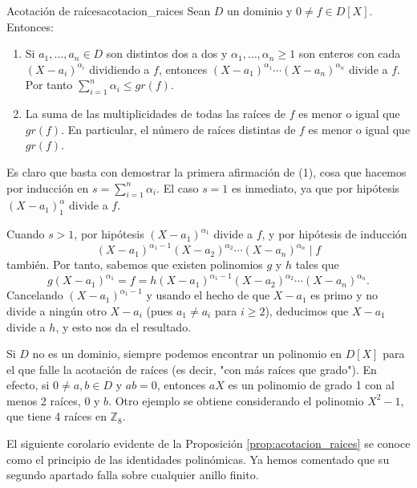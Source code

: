 \begin{proposition}{Acotación de raíces}{acotacion_raices}
Sean $D$ un dominio y $0 \neq f \in D[X]$. Entonces:

\begin{enumerate}
\item Si $a_1, \ldots, a_n \in D$ son distintos dos a dos y $\alpha_1, \ldots, \alpha_n \geq 1$ son enteros con cada $(X - a_i)^{\alpha_i}$ dividiendo a $f$, entonces $(X - a_1)^{\alpha_1} \cdots (X - a_n)^{\alpha_n}$ divide a $f$. Por tanto $\sum_{i=1}^n \alpha_i \leq gr(f)$.

\item La suma de las multiplicidades de todas las raíces de $f$ es menor o igual que $gr(f)$. En particular, el número de raíces distintas de $f$ es menor o igual que $gr(f)$.
\end{enumerate}
\end{proposition}

\begin{proofbox}
Es claro que basta con demostrar la primera afirmación de (1), cosa que hacemos por inducción en $s = \sum_{i=1}^n \alpha_i$. El caso $s = 1$ es inmediato, ya que por hipótesis $(X - a_1)^\alpha_1$ divide a $f$.

Cuando $s > 1$, por hipótesis $(X - a_1)^{\alpha_1}$ divide a $f$, y por hipótesis de inducción
\[
(X - a_1)^{\alpha_1 - 1}(X - a_2)^{\alpha_2} \cdots (X - a_{n})^{\alpha_{n}} \mid f
\]
también. Por tanto, sabemos que existen polinomios $g$ y $h$ tales que
\[
g(X - a_1)^{\alpha_1} = f = h(X - a_1)^{\alpha_1-1}(X - a_2)^{\alpha_2} \cdots (X - a_n)^{\alpha_n}.
\]
Cancelando $(X - a_1)^{\alpha_1-1}$ y usando el hecho de que $X - a_1$ es primo y no divide a ningún otro $X - a_i$ (pues $a_1 \neq a_i$ para $i \geq 2$), deducimos que $X - a_1$ divide a $h$, y esto nos da el resultado.
\end{proofbox}

Si $D$ no es un dominio, siempre podemos encontrar un polinomio en $D[X]$ para el que falle la acotación de raíces (es decir, "con más raíces que grado"). En efecto, si $0 \neq a, b \in D$ y $ab = 0$, entonces $aX$ es un polinomio de grado 1 con al menos 2 raíces, 0 y $b$. Otro ejemplo se obtiene considerando el polinomio $X^2 - 1$, que tiene 4 raíces en $\mathbb{Z}_8$.

El siguiente corolario evidente de la Proposición \ref{prop:acotacion_raices} se conoce como el principio de las identidades polinómicas. Ya hemos comentado que su segundo apartado falla sobre cualquier anillo finito.

